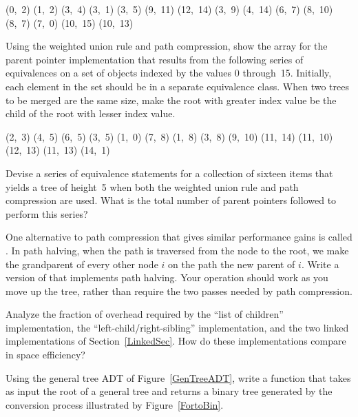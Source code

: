 \begin{exercises}
(0,~2) (1,~2) (3,~4) (3,~1) (3,~5) (9,~11) (12,~14) (3,~9)
(4,~14) (6,~7) (8,~10) (8,~7) (7,~0) (10,~15) (10,~13)

\item
Using the weighted union rule and path compression, show the array for
the parent pointer implementation that results from the following
series of equivalences on a set of objects indexed by the
values 0 through~15.
Initially, each element in the set should be in a separate equivalence
class.
When two trees to be merged are the same size, make the root with
greater index value be the child of the root with lesser index value.
\smallskip

(2,~3) (4,~5) (6,~5) (3,~5) (1,~0) (7,~8) (1,~8) (3,~8) (9,~10)
(11,~14) (11,~10) (12,~13) (11,~13) (14,~1)

\item
Devise a series of equivalence statements for a collection of sixteen
items that yields a tree of height~5 when both the weighted union rule
and path compression are
used.
What is the total number of parent pointers followed to perform this
series?

\item
\label{PathHalf}
One alternative to path compression that gives similar performance
gains is called .
In path halving, when the path is traversed from the node to the root,
we make the grandparent of every other node $i$ on the path the new
parent of $i$.
Write a version of  that implements path halving.
Your  operation should work as you move up the tree, rather
than require the two passes needed by path compression.

\item
Analyze the fraction of overhead required by the
``list of children''
implementation, the ``left-child/right-sibling''
implementation,
and the two linked implementations of
Section~\ref{LinkedSec}.
How do these implementations compare in space efficiency?

\item
Using the general tree ADT
of Figure~\ref{GenTreeADT}, write a
function that takes as input the root of a general tree and returns a
binary tree generated by the conversion process illustrated by
Figure~\ref{FortoBin}.


\end{exercises}
